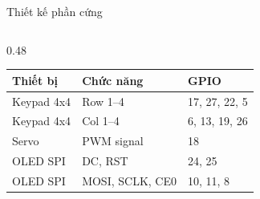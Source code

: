 \documentclass[aspectratio=169,11pt]{beamer}
\begin{document}
\begin{frame}{Thiết kế phần cứng}
    \begin{columns}[T]
        \begin{column}{0.48\textwidth}
            \small
            \begin{tabular}{@{}lll@{}}
                \toprule
                \textbf{Thiết bị} & \textbf{Chức năng} & \textbf{GPIO}\\
                \midrule
                Keypad 4x4 & Row 1--4 & 17, 27, 22, 5\\
                Keypad 4x4 & Col 1--4 & 6, 13, 19, 26\\
                Servo & PWM signal & 18\\
                OLED SPI & DC, RST & 24, 25\\
                OLED SPI & MOSI, SCLK, CE0 & 10, 11, 8\\
                \bottomrule
            \end{tabular}


\end{column}
\end{columns}
\end{frame}
\end{document}
